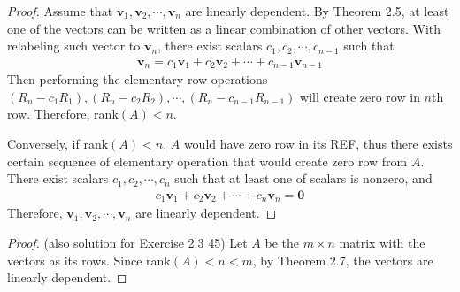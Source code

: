 
\begin{proof}
	Assume that $\textbf{v}_1, \textbf{v}_2, \cdots, \textbf{v}_n$ are linearly dependent. By Theorem 2.5, at least one of the vectors can be written as a linear combination of other vectors. With relabeling such vector to $\textbf{v}_n$, there exist scalars $c_1, c_2, \cdots, c_{n-1}$ such that
	\begin{align*}
		\textbf{v}_n = c_1\textbf{v}_1 + c_2\textbf{v}_2 + \cdots + c_{n-1}\textbf{v}_{n-1}
	\end{align*}
	Then performing the elementary row operations $(R_n - c_1R_1), (R_n - c_2R_2), \cdots, (R_n - c_{n-1}R_{n-1})$ will create zero row in $n$th row. Therefore, rank$(A) < n$.
	
	\noindent Conversely, if rank$(A) < n$, $A$ would have zero row in its REF, thus there exists certain sequence of elementary operation that would create zero row from $A$. There exist scalars $c_1, c_2, \cdots, c_n$ such that at least one of scalars is nonzero, and
	\begin{align*}
		c_1\textbf{v}_1 + c_2\textbf{v}_2 + \cdots + c_n\textbf{v}_n = \textbf{0}
	\end{align*} Therefore, $\textbf{v}_1, \textbf{v}_2, \cdots, \textbf{v}_n$ are linearly dependent.
\end{proof}


\begin{proof}
	(also solution for Exercise 2.3 45) Let $A$ be the $m \times n$ matrix with the vectors as its rows. Since rank$(A) < n < m$, by Theorem 2.7, the vectors are linearly dependent.
\end{proof}

